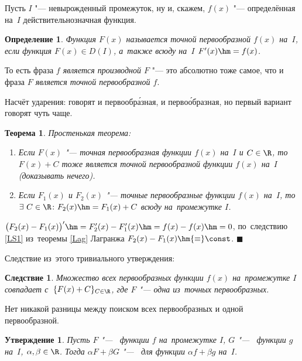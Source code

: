 \documentclass[a4paper,10pt,twoside]{article}
\newtheorem{Def}{Определение}[section]
\newtheorem{The}{Теорема}[section]
\newtheorem{Sl}{Следствие}[section]
\newtheorem{Ut}{Утверждение}[section]
\newenvironment{Proof}
       {\par\noindent{\textbf{Доказательство.}}}
       {\hfill$\scriptstyle\blacksquare$}
\begin{document}
Пусть $I$ "--- невырожденный промежуток, ну и, скажем, $f(x)$ "--- определённая на~$I$ действительнозначная функция.

\begin{Def}
  Функция $F(x)$ называется точной первообразной $f(x)$ на~$I$, если функция $F(x)\in D(I)$, а~также всюду на~$I$ $F'(x)\hm=f(x)$.
\end{Def}

То есть фраза \textit{$f$ является производной $F$} "--- это абсолютно тоже самое, что и фраза \textit{$F$ является точной первообразной $f$}.

Насчёт ударения: говорят и первообр\'{а}зная, и перво\'{о}бразная, но первый вариант говорят чуть чаще.



\begin{The} Простенькая теорема:

  \begin{enumerate}
    \item Если $F(x)$ "--- точная первообразная функции $f(x)$ на~$I$ и $C\in\R$, то $F(x)+C$ тоже является точной первообразной функции $f(x)$ на~$I$ (доказывать нечего).

    \item Если $F_1(x)$ и $F_2(x)$ "--- точные первообразные функции $f(x)$ на~$I$, то $\exists\  C\in\R\colon F_2(x)\hm=F_1(x) + C$ всюду на~промежутке $I$.
  \end{enumerate}

\end{The}

\begin{Proof}
  $\big(F_2(x)-F_1(x)\big)' \hm= F_2'(x)-F_1'(x)\hm=f(x)-f(x)\hm=0$, по~следствию \ref{LS1} из~теоремы \ref{Lag} Лагранжа $F_2(x)-F_1(x)\hm{\equiv}\const$.
\end{Proof}

Следствие из~этого тривиального утверждения:

\begin{Sl}
  Множество всех первообразных функции $f(x)$ на~промежутке $I$ совпадает с~$\{F(x)+C\}_{C\in\R}$, где $F$ "--- одна из~точных первообразных.
\end{Sl}

Нет никакой разницы между поиском всех первообразных и одной первообразной.

\begin{Ut}
  Пусть $F$ "--- \tp\ функции $f$ на~промежутке $I$, $G$ "--- \tp\ функции $g$ на~$I$, $\alpha,\beta\in\R$. Тогда
  $\alpha F+\beta G$ "--- \tp\ для функции $\alpha f+\beta g$ на~$I$.
\end{Ut}
\end{document}
